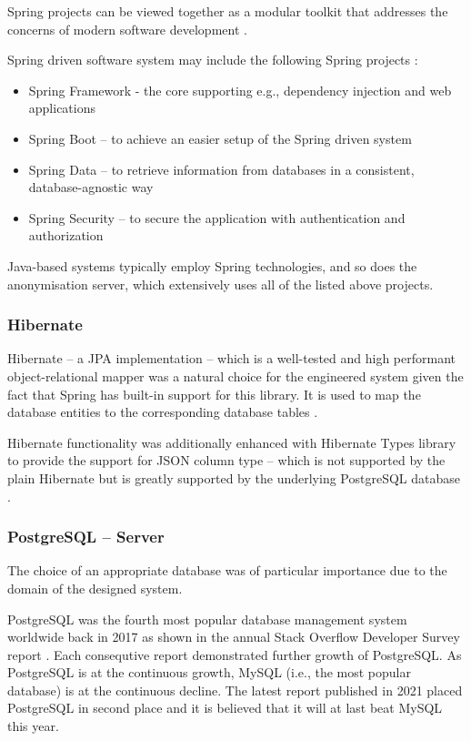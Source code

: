 \documentclass[a4paper,twoside,12pt]{book}
\begin{document}
Spring projects can be viewed together as a modular toolkit that addresses the concerns of modern software development \cite{bib:spring_in_action}.

Spring driven software system may include the following Spring projects \cite{bib:spring_docs}:
\begin{itemize}
\item Spring Framework - the core supporting e.g., dependency injection and web applications
\item Spring Boot – to achieve an easier setup of the Spring driven system
\item Spring Data – to retrieve information from databases in a consistent, database-agnostic way
\item Spring Security – to secure the application with authentication and authorization
\end{itemize}

Java-based systems typically employ Spring technologies, and so does the anonymisation server, which extensively uses all of the listed above projects. 

\subsubsection{Hibernate}

Hibernate – a JPA implementation – which is a well-tested and high performant \cite{bib:hibernate_high_performance} object-relational mapper was a natural choice for the engineered system given the fact that Spring has built-in support for this library. It is used to map the database entities to the corresponding database tables \cite{bib:hibernate_docs}.

Hibernate functionality was additionally enhanced with Hibernate Types library \cite{bib:hibernate_types} to provide the support for JSON column type – which is not supported by the plain Hibernate but is greatly supported by the underlying PostgreSQL database \cite{bib:postgresql_json}.

\subsubsection{PostgreSQL – Server}

The choice of an appropriate database was of particular importance due to the domain of the designed system.

PostgreSQL was the fourth most popular database management system worldwide back in 2017 as shown in the annual Stack Overflow Developer Survey report \cite{bib:stackoverflow2017}. Each consequtive report demonstrated further growth of PostgreSQL. As PostgreSQL is at the continuous growth, MySQL (i.e., the most popular database) is at the continuous decline. The latest report published in 2021 \cite{bib:stackoverflow2021} placed PostgreSQL in second place and it is believed that it will at last beat MySQL this year.
\end{document}
